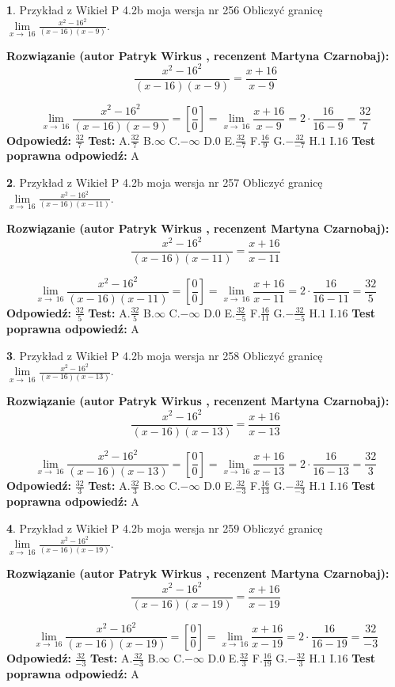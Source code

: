 \documentclass[12pt, a4paper]{article}
\theoremstyle{definition} %
\newtheorem{zad}{}
\newcommand{\zadStart}[1]{\begin{zad}#1\newline}
\newcommand{\zadStop}{\end{zad}}
\newcommand{\rozwStart}[2]{\noindent \textbf{Rozwiązanie (autor #1 , recenzent #2): }\newline}
\newcommand{\rozwStop}{\newline}
\newcommand{\odpStart}{\noindent \textbf{Odpowiedź:}\newline}
\newcommand{\odpStop}{\newline}
\newcommand{\testStart}{\noindent \textbf{Test:}\newline}
\newcommand{\testStop}{\newline}
\newcommand{\kluczStart}{\noindent \textbf{Test poprawna odpowiedź:}\newline}
\newcommand{\kluczStop}{\newline}
\begin{document}
\zadStart{Przykład z Wikieł P 4.2b moja wersja nr 256}
Obliczyć granicę $\lim\limits_{x\to\ 16}\frac{x^{2}-16^{2}}{(x-16)(x-9)}$.
\zadStop
\rozwStart{Patryk Wirkus}{Martyna Czarnobaj}
$$\frac{x^{2}-16^{2}}{(x-16)(x-9)}=\frac{x+16}{x-9}$$

$$\lim\limits_{x\to\ 16}\frac{x^{2}-16^{2}}{(x-16)(x-9)}=[\frac{0}{0}]=\lim\limits_{x\to\ 16}\frac{x+16}{x-9}=2 \cdot \frac{16}{16-9} = \frac{32}{7}$$
\rozwStop
\odpStart
$\frac{32}{7}$
\odpStop
\testStart
A.$\frac{32}{7}$
B.$\infty$
C.$-\infty$
D.$0$
E.$\frac{32}{-7}$
F.$\frac{16}{9}$
G.$-\frac{32}{-7}$
H.$1$
I.$16$
\testStop
\kluczStart
A
\kluczStop



\zadStart{Przykład z Wikieł P 4.2b moja wersja nr 257}
Obliczyć granicę $\lim\limits_{x\to\ 16}\frac{x^{2}-16^{2}}{(x-16)(x-11)}$.
\zadStop
\rozwStart{Patryk Wirkus}{Martyna Czarnobaj}
$$\frac{x^{2}-16^{2}}{(x-16)(x-11)}=\frac{x+16}{x-11}$$

$$\lim\limits_{x\to\ 16}\frac{x^{2}-16^{2}}{(x-16)(x-11)}=[\frac{0}{0}]=\lim\limits_{x\to\ 16}\frac{x+16}{x-11}=2 \cdot \frac{16}{16-11} = \frac{32}{5}$$
\rozwStop
\odpStart
$\frac{32}{5}$
\odpStop
\testStart
A.$\frac{32}{5}$
B.$\infty$
C.$-\infty$
D.$0$
E.$\frac{32}{-5}$
F.$\frac{16}{11}$
G.$-\frac{32}{-5}$
H.$1$
I.$16$
\testStop
\kluczStart
A
\kluczStop



\zadStart{Przykład z Wikieł P 4.2b moja wersja nr 258}
Obliczyć granicę $\lim\limits_{x\to\ 16}\frac{x^{2}-16^{2}}{(x-16)(x-13)}$.
\zadStop
\rozwStart{Patryk Wirkus}{Martyna Czarnobaj}
$$\frac{x^{2}-16^{2}}{(x-16)(x-13)}=\frac{x+16}{x-13}$$

$$\lim\limits_{x\to\ 16}\frac{x^{2}-16^{2}}{(x-16)(x-13)}=[\frac{0}{0}]=\lim\limits_{x\to\ 16}\frac{x+16}{x-13}=2 \cdot \frac{16}{16-13} = \frac{32}{3}$$
\rozwStop
\odpStart
$\frac{32}{3}$
\odpStop
\testStart
A.$\frac{32}{3}$
B.$\infty$
C.$-\infty$
D.$0$
E.$\frac{32}{-3}$
F.$\frac{16}{13}$
G.$-\frac{32}{-3}$
H.$1$
I.$16$
\testStop
\kluczStart
A
\kluczStop



\zadStart{Przykład z Wikieł P 4.2b moja wersja nr 259}
Obliczyć granicę $\lim\limits_{x\to\ 16}\frac{x^{2}-16^{2}}{(x-16)(x-19)}$.
\zadStop
\rozwStart{Patryk Wirkus}{Martyna Czarnobaj}
$$\frac{x^{2}-16^{2}}{(x-16)(x-19)}=\frac{x+16}{x-19}$$

$$\lim\limits_{x\to\ 16}\frac{x^{2}-16^{2}}{(x-16)(x-19)}=[\frac{0}{0}]=\lim\limits_{x\to\ 16}\frac{x+16}{x-19}=2 \cdot \frac{16}{16-19} = \frac{32}{-3}$$
\rozwStop
\odpStart
$\frac{32}{-3}$
\odpStop
\testStart
A.$\frac{32}{-3}$
B.$\infty$
C.$-\infty$
D.$0$
E.$\frac{32}{3}$
F.$\frac{16}{19}$
G.$-\frac{32}{3}$
H.$1$
I.$16$
\testStop
\kluczStart
A
\kluczStop
\end{document}
